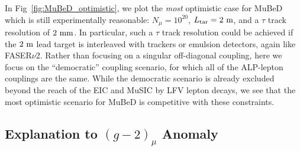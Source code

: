 In Fig~\ref{fig:MuBeD_optimistic}, we plot the {\it most} optimistic case for MuBeD which is still experimentally reasonable: $N_\mu = 10^{20}$, $L_{\rm tar} = 2~{\rm m}$, and a $\tau$ track resolution of $2~{\rm mm}$. In particular, such a $\tau$ track resolution could be achieved if the $2~{\rm m}$ lead target is interleaved with trackers or emulsion detectors, again like FASER$\nu$2. Rather than focusing on a singular off-diagonal coupling, here we focus on the ``democratic'' coupling scenario, for which all of the ALP-lepton couplings are the same. While the democratic scenario is already excluded beyond the reach of the EIC and MuSIC by LFV lepton decays, we see that the most optimistic scenario for MuBeD is competitive with these constraints. 

\subsection{Explanation to $(g-2)_\mu$ Anomaly}\label{sec:MuBeD_MuSIC_g_2}

